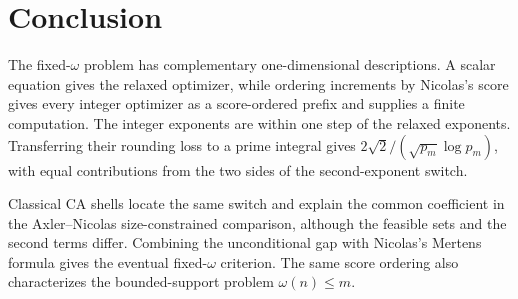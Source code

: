 \section{Conclusion}
\label{s-conclusion}

The fixed-\(\omega\) problem has complementary one-dimensional
descriptions. A scalar equation gives the relaxed optimizer, while
ordering increments by Nicolas's score gives every integer optimizer as a
score-ordered prefix and supplies a finite computation. The integer exponents
are within one step of the relaxed exponents. Transferring their rounding
loss to a prime integral gives
\(2\sqrt2/(\sqrt{p_m}\log p_m)\), with equal contributions from the two
sides of the second-exponent switch.

Classical CA shells locate the same switch and explain the common
coefficient in the Axler--Nicolas size-constrained comparison, although
the feasible sets and the second terms differ. Combining the unconditional
gap with Nicolas's Mertens formula gives the eventual fixed-\(\omega\)
criterion. The same score ordering also characterizes the bounded-support
problem \(\omega(n)\leq m\).
